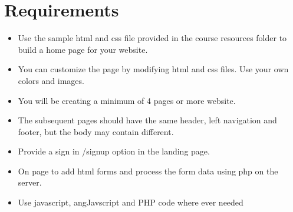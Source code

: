 \documentclass[9pt,b5paper]{article}
\begin{document}
\section{Requirements}
\label{sec-4}
\begin{itemize}
\item Use the  sample html and css file provided in the course resources folder to build a home page for your website.
\item You can customize the page by modifying html and css files. Use your own colors and images.
\item You will be creating a minimum of 4 pages or more website.
\item The subsequent pages should have the same header, left navigation and footer, but the body may contain different.
\item Provide a sign in /signup option in the landing page.
\item On page to add html forms and process the form data using php on the server.
\item Use javascript, angJavscript and PHP code where ever needed
\end{itemize}
\end{document}

